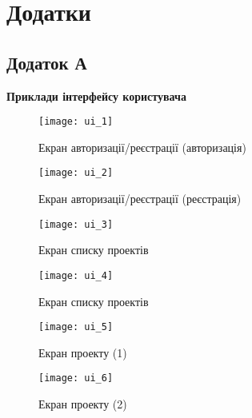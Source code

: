 \setcounter{chapter}{1}
\renewcommand\thechapter{\Alph{chapter}}

\chapter*{Додатки}

\centeredsection

\captionsetup[figure]{labelsep=hyphen, justification=centering}


\section*{Додаток А}
\begin{center}
	\bfseries Приклади інтерфейсу користувача
\end{center}

\begin{figure}[H]
	\centering
	\texttt{[image: ui\_1]}
	\caption{Екран авторизації/реєстрації (авторизація)}
	\label{scr_ui_auth}
\end{figure}

\begin{figure}[H]
	\centering
	\texttt{[image: ui\_2]}
	\caption{Екран авторизації/реєстрації (реєстрація)}
	\label{scr_ui_signup}
\end{figure}

\begin{figure}[H]
	\centering
	\texttt{[image: ui\_3]}
	\caption{Екран списку проектів}
	\label{scr_ui_projects_list}
\end{figure}

\begin{figure}[H]
	\centering
	\texttt{[image: ui\_4]}
	\caption{Екран списку проектів}
	\label{scr_ui_project_creation}
\end{figure}

\begin{figure}[H]
	\centering
	\texttt{[image: ui\_5]}
	\caption{Екран проекту (1)}
	\label{scr_ui_project_1}
\end{figure}

\begin{figure}[H]
	\centering
	\texttt{[image: ui\_6]}
	\caption{Екран проекту (2)}
	\label{scr_ui_project_2}
\end{figure}

